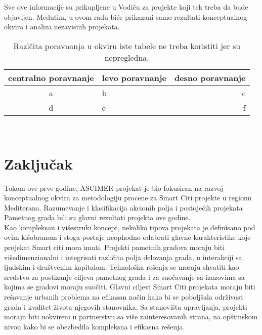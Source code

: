 \documentclass[a4paper,12pt]{article}
\begin{document}
{Sve ove informacije su prikupljene u Vodiču za projekte koji tek treba da bude objavljen. Međutim, u ovom radu biće prikazani samo rezultati konceptualnog okvira i analiza nezavisnih projekata.\\



\begin{table}[h!]
\begin{center}
\caption{Razlčita poravnanja u okviru iste tabele ne treba koristiti jer su nepregledna.}
\begin{tabular}{|c|l|r|} \hline
centralno poravnanje& levo poravnanje& desno poravnanje\\ \hline
a &b&c\\ \hline
d &e&f\\ \hline
\end{tabular}
\label{tab:tabela1}
\end{center}
\end{table}

\\


\appendix
\section{Zaključak}
\label{sec:zakljucak}
Tokom ove prve godine, ASCIMER projekat je bio fokusiran na razvoj konceptualnog okvira za metodologiju procene za Smart Citi projekte u regionu Mediterana. Razumevanje i klasifikacija akcionih polja i postojećih projekata Pametnog grada bili su glavni rezultati projekta ove godine. \\

Kao kompleksan i višestruki koncept, nekoliko tipova projekata je definisano pod ovim kišobranom i stoga postaje neophodno odabrati glavne karakteristike koje projekat Smart citi mora imati. Projekti pametnih gradova moraju biti višedimenzionalni i integrisati različita polja delovanja grada, u interakciji sa ljudskim i društvenim kapitalom. Tehnološka rešenja se moraju shvatiti kao sredstvo za postizanje ciljeva pametnog grada i za suočavanje sa izazovima sa kojima se gradovi moraju suočiti. Glavni ciljevi Smart Citi projekata moraju biti rešavanje urbanih problema na efikasan način kako bi se poboljšala održivost grada i kvalitet života njegovih stanovnika. Sa stanovišta upravljanja, projekti moraju biti uokvireni u partnerstvu sa više zainteresovanih strana, na opštinskom nivou kako bi se obezbedila kompleksna i efikasna rešenja. \\

}
\end{document}
